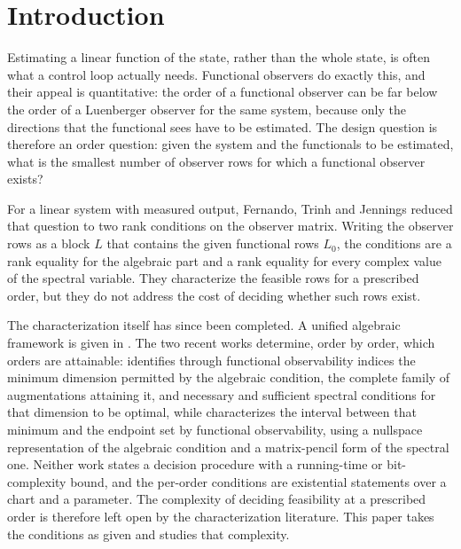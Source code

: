 \section{Introduction}\label{sec:intro}

Estimating a linear function of the state, rather than the whole state, is often what a
control loop actually needs. Functional observers do exactly this, and their appeal is
quantitative: the order of a functional observer can be far below the order of a
Luenberger observer for the same system, because only the directions that the functional
sees have to be estimated. The design question is therefore an order question: given the
system and the functionals to be estimated, what is the smallest number of observer rows
for which a functional observer exists?

For a linear system with measured output, Fernando, Trinh and Jennings \cite{fer10}
reduced that question to two rank conditions on the observer matrix. Writing the observer
rows as a block $L$ that contains the given functional rows $L_0$, the conditions are a
rank equality for the algebraic part and a rank equality for every complex value of the
spectral variable. They characterize the feasible rows for a prescribed order, but they do
not address the cost of deciding whether such rows exist.

The characterization itself has since been completed. A unified algebraic framework is
given in \cite{dar25}. The two recent works \cite{fer26a,fer26b} determine, order by order,
which orders are attainable: \cite{fer26a} identifies through functional observability
indices the minimum dimension permitted by the algebraic condition, the complete family of
augmentations attaining it, and necessary and sufficient spectral conditions for that
dimension to be optimal, while \cite{fer26b} characterizes the interval between that
minimum and the endpoint set by functional observability, using a nullspace representation
of the algebraic condition and a matrix-pencil form of the spectral one. Neither work
states a decision procedure with a running-time or bit-complexity bound, and the per-order
conditions are existential statements over a chart and a parameter. The complexity of
deciding feasibility at a prescribed order is therefore left open by the characterization
literature. This paper takes the conditions as given and studies that complexity.

